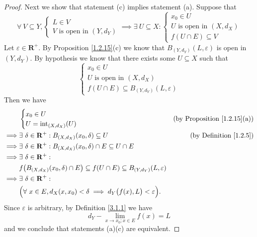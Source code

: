 \begin{proof}
    Next we show that statement (c) implies statement (a).
    Suppose that
    \[
        \forall\ V \subseteq Y, \begin{cases}
            L \in V \\
            V \text{ is open in } (Y, d_Y)
        \end{cases} \implies \exists\ U \subseteq X : \begin{cases}
            x_0 \in U                      \\
            U \text{ is open in } (X, d_X) \\
            f(U \cap E) \subseteq V
        \end{cases}
    \]
    Let \(\varepsilon \in \mathbf{R}^+\).
    By Proposition \ref{1.2.15}(c) we know that \(B_{(Y, d_Y)}(L, \varepsilon)\) is open in \((Y, d_Y)\).
    By hypothesis we know that there exists some \(U \subseteq X\) such that
    \[
        \begin{cases}
            x_0 \in U                      \\
            U \text{ is open in } (X, d_X) \\
            f(U \cap E) \subseteq B_{(Y, d_Y)}(L, \varepsilon)
        \end{cases}
    \]
    Then we have
    \begin{align*}
                 & \begin{cases}
            x_0 \in U \\
            U = \text{int}_{(X, d_X)}(U)
        \end{cases}                                                                               & \text{(by Proposition \ref{1.2.15}(a))} \\
        \implies & \exists\ \delta \in \mathbf{R}^+ : B_{(X, d_X)}(x_0, \delta) \subseteq U                                 & \text{(by Definition \ref{1.2.5})}      \\
        \implies & \exists\ \delta \in \mathbf{R}^+ : B_{(X, d_X)}(x_0, \delta) \cap E \subseteq U \cap E                                                             \\
        \implies & \exists\ \delta \in \mathbf{R}^+ :                                                                                                                 \\
                 & f\big(B_{(X, d_X)}(x_0, \delta) \cap E\big) \subseteq f(U \cap E) \subseteq B_{(Y, d_Y)}(L, \varepsilon)                                           \\
        \implies & \exists\ \delta \in \mathbf{R}^+ :                                                                                                                 \\
                 & \Big(\forall\ x \in E, d_X(x, x_0) < \delta \implies d_Y\big(f(x), L\big) < \varepsilon\Big).
    \end{align*}
    Since \(\varepsilon\) is arbitrary, by Definition \ref{3.1.1} we have
    \[
        d_Y - \lim_{x \to x_0 ; x \in E} f(x) = L
    \]
    and we conclude that statements (a)(c) are equivalent.


\end{proof}

